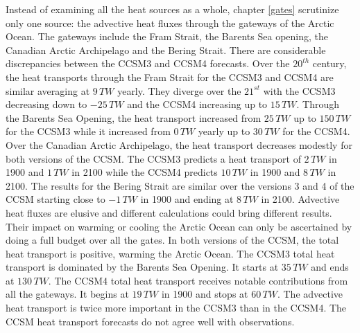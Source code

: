 Instead of examining all the heat sources as a whole, chapter \ref{gates} scrutinize only one source: the advective heat fluxes through the gateways of the Arctic Ocean. The gateways include the Fram Strait, the Barents Sea opening, the Canadian Arctic Archipelago and the Bering Strait. There are considerable discrepancies between the CCSM3 and CCSM4 forecasts. Over the $20^{th}$ century, the heat transports through the Fram Strait for the CCSM3 and CCSM4 are similar averaging at $9\,TW$ yearly. They diverge over the $21^{st}$ with the CCSM3 decreasing down to $-25\,TW$ and the CCSM4 increasing up to $15\,TW$. Through the Barents Sea Opening, the heat transport increased from $25\,TW$ up to $150\,TW$ for the CCSM3 while it increased from $0\,TW$ yearly up to $30\,TW$ for the CCSM4. Over the Canadian Arctic Archipelago, the heat transport decreases modestly for both versions of the CCSM. The CCSM3 predicts a heat transport of $2\,TW$ in 1900 and $1\,TW$ in 2100 while the CCSM4 predicts $10\,TW$ in 1900 and $8\,TW$ in 2100. The results for the Bering Strait are similar over the versions 3 and 4 of the CCSM starting close to $-1\,TW$ in 1900 and ending at $8\,TW$ in 2100. Advective heat fluxes are elusive and different calculations could bring different results. Their impact on warming or cooling the Arctic Ocean can only be ascertained by doing a full budget over all the gates. In both versions of the CCSM, the total heat transport is positive, warming the Arctic Ocean. The CCSM3 total heat transport is dominated by the Barents Sea Opening. It starts at $35\,TW$ and ends at $130\,TW$. The CCSM4 total heat transport receives notable contributions from all the gateways. It begins at $19\,TW$ in 1900 and stops at $60\,TW$. The advective heat transport is twice more important in the CCSM3 than in the CCSM4. The CCSM heat transport forecasts do not agree well with observations. 



